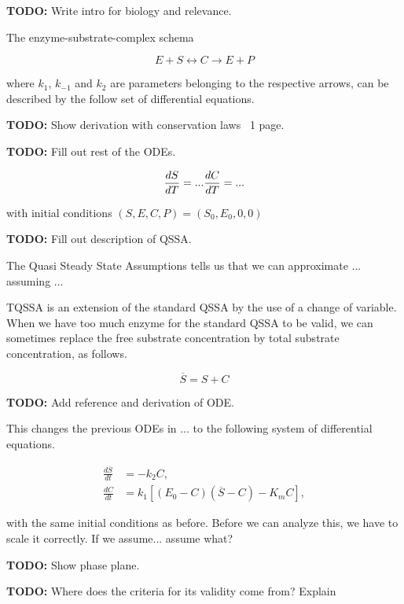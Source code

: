 \documentclass[12pt]{report}
\begin{document}
\textbf{TODO: } Write intro for biology and relevance.

The enzyme-substrate-complex schema

\begin{equation}
E + S \leftrightarrow C \rightarrow E + P
\end{equation}

where $k_1$, $k_{-1}$ and $k_2$ are parameters belonging to the
respective arrows, can be described by the follow set of differential
equations.

\textbf{TODO:} Show derivation with conservation laws ~1 page.

\textbf{TODO:} Fill out rest of the ODEs.

\begin{equation}
\frac{dS}{dT} = ... \\
\frac{dC}{dT} = ...
\end{equation}

with initial conditions $(S,E,C,P) = (S_0, E_0, 0, 0)$

\textbf{TODO:} Fill out description of QSSA.

The Quasi Steady State Assumptions tells us that we can approximate
... assuming ...

TQSSA is an extension of the standard QSSA by the use of a change of
variable. When we have too much enzyme for the standard QSSA to be
valid, we can sometimes replace the free substrate concentration by
total substrate concentration, as follows.

\begin{equation}
\overline{S} = S+C
\end{equation}

\textbf{TODO:} Add reference and derivation of ODE.

This changes the previous ODEs in ... to the following system of
differential equations.

\begin{align*}
\frac{d\overline{S}}{dt} &= -k_2C, \\
\frac{dC}{dt} &= k_1[(E_0 - C)(\overline{S}-C)-K_m C],
\end{align*}

with the same initial conditions as before. Before we can analyze
this, we have to scale it correctly. If we assume... assume what?

\textbf{TODO:} Show phase plane.

\textbf{TODO:} Where does the criteria for its validity come from? Explain
\end{document}
